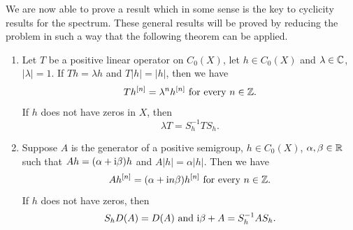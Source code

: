 We are now able to prove a result which in some sense is the key to cyclicity results for the spectrum.
	These general results will be proved by reducing the problem in such a way that the following theorem can be applied.
\begin{theorem}\label{thm:b3-2.4}
\begin{enumerate}	
\item
Let $T$ be a positive linear operator on $C_{0}(X)$, let $h \in C_{0}(X)$ and $\lambda \in \mathbb{C}$, $|\lambda| = 1$.
	If\/ $Th = \lambda h$ and $T|h| = |h|$, then we have 
    \[
    Th^{[n]} = \lambda^{n}h^{[n]} \text{ for every } n \in \mathbb{Z}.
    \]
	If\/ $h$ does not have zeros in $X$, then 
	\[
	\lambda T = S_{h}^{-1}TS_{h}.
	\]
\item
Suppose $A$ is the generator of a positive semigroup, $h \in C_{0}(X)$, $\alpha,\beta \in \mathbb{R}$ such that $Ah = (\alpha+\mathrm{i}\beta )h$ and $A|h| = \alpha|h|$. 
	Then we have 
    \[
    Ah^{[n]} = (\alpha+\mathrm{i} n\beta)h^{[n]} \text{ for every } n \in \mathbb{Z} .
    \]
	If\/ $h$ does not have zeros, then 
	\[
	S_{h}D(A) = D(A) \text{ and } \mathrm{i}\beta + A = S_{h}^{-1}AS_{h}.
	\]
\end{enumerate}
\end{theorem}
